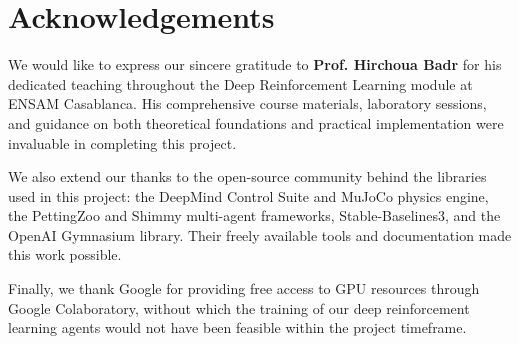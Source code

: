 \chapter*{\center \Large  Acknowledgements}

We would like to express our sincere gratitude to \textbf{Prof. Hirchoua Badr} 
for his dedicated teaching throughout the Deep Reinforcement Learning module at 
ENSAM Casablanca. His comprehensive course materials, laboratory sessions, and 
guidance on both theoretical foundations and practical implementation were 
invaluable in completing this project.

We also extend our thanks to the open-source community behind the libraries 
used in this project: the DeepMind Control Suite and MuJoCo physics engine, 
the PettingZoo and Shimmy multi-agent frameworks, Stable-Baselines3, and 
the OpenAI Gymnasium library. Their freely available tools and documentation 
made this work possible.

Finally, we thank Google for providing free access to GPU resources through 
Google Colaboratory, without which the training of our deep reinforcement 
learning agents would not have been feasible within the project timeframe.
